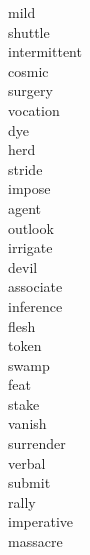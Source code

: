\documentclass[b5paper, 11pt]{ctexart}
\begin{document}
\begin{multicols*}{3}
\begin{description}
\item[mild]

\item[shuttle]

\item[intermittent]

\item[cosmic]

\item[surgery]

\item[vocation]

\item[dye]

\item[herd]

\item[stride]

\item[impose]

\item[agent]

\item[outlook]

\item[irrigate]

\item[devil]

\item[associate]

\item[inference]

\item[flesh]

\item[token]

\item[swamp]

\item[feat]

\item[stake]

\item[vanish]

\item[surrender]

\item[verbal]

\item[submit]

\item[rally]

\item[imperative]

\item[massacre]


\end{description}
\end{multicols*}
\end{document}
